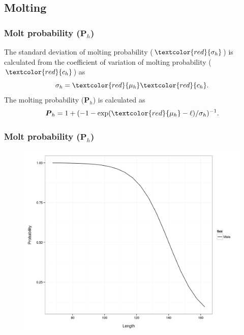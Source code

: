 \documentclass{beamer}
\begin{document}
\subsection{Molting}
\begin{frame}
\frametitle{Molt probability ($\boldsymbol{P}_h$)}
The standard deviation of molting probability ($\textcolor{red}{\sigma_h}$) is
calculated from the coefficient of variation of molting probability
($\textcolor{red}{c_h}$) as
\begin{equation*}
  \sigma_h = \textcolor{red}{\mu_h} \textcolor{red}{c_h}.
\end{equation*}
The molting probability ($\boldsymbol{P}_h$) is calculated as
\begin{equation*}
  \boldsymbol{P}_h = 1 + (-1 - \exp(\textcolor{red}{\mu_h} - \ell) / \sigma_h)^{-1}.
\end{equation*}
\end{frame}


\begin{frame}
\frametitle{Molt probability ($\boldsymbol{P}_h$)}
\begin{figure}[!htbp]
  \centering
  \includegraphics[width=0.75\linewidth]{../../examples/bbrkc/OneSex/figure/molt_prob.png}
\end{figure}
\end{frame}

\end{document}

